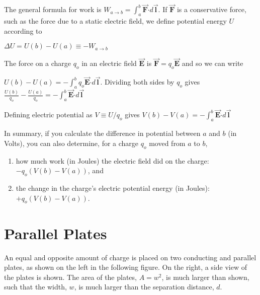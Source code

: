 \documentclass{article}
\newcommand{\ds}[0]{\displaystyle}
\newcommand{\bfvec}[1]{\vec{\mathbf{#1}}}
\newcommand{\bfcdot}[0]{\boldsymbol{\cdot}}
\begin{document}
The general formula for work is $W_{a\rightarrow b}=\int_a^b \bfvec{F}\bfcdot d\bfvec{l}$. If $\bfvec{F}$ is a conservative force, such as the force due to a static electric field, we define potential energy $U$ according to

$\Delta U = U(b)-U(a) \equiv -W_{a\rightarrow b}$

The force on a charge $q_o$ in an electric field $\bfvec{E}$ is $\bfvec{F}=q_o\bfvec{E}$ and so we can write

$\ds U(b)-U(a) = -\int_a^b q_o\bfvec{E}\bfcdot d\bfvec{l}$. Dividing both sides by $q_o$ gives $\ds\frac{U(b)}{q_o}-\frac{U(a)}{q_o} = -\int_a^b\bfvec{E}\bfcdot d\bfvec{l}$

Defining electric potential as $V\equiv U/q_o$ gives $V(b)-V(a) = -\int_a^b\bfvec{E}\bfcdot d\bfvec{l}$

In summary, if you calculate the difference in potential between $a$ and $b$ (in Volts), you can also determine, for a charge $q_o$ moved from $a$ to $b$,

\begin{enumerate}

  \item how much work (in Joules) the electric field did on the charge: $-q_o(V(b)-V(a))$, and

  \item the change in the charge's electric potential energy (in Joules): $+q_o(V(b)-V(a))$.

\end{enumerate}

\ifsolutions\else
\newpage
\fi

\section{Parallel Plates}

An equal and opposite amount of charge is placed on two conducting and parallel plates, as shown on the left in the following figure. On the right, a side view of the plates is shown. The area of the plates, $A = w^2$, is much larger than shown, such that the width, $w$, is much larger than the separation distance, $d$.


\end{document}
